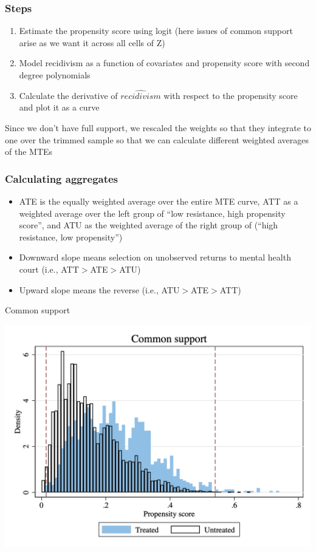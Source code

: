 \documentclass{beamer}
\begin{document}
\begin{frame}
  \frametitle{Steps}

  \begin{enumerate}
    \item Estimate the propensity score using logit (here issues of common support arise as we want it across all cells of Z)
    \item Model recidivism as a function of covariates and propensity score with second degree polynomials
    \item Calculate the derivative of $\widehat{recidivism}$ with respect to the propensity score and plot it as a curve
  \end{enumerate}

  \bigskip

  Since we don't have full support, we rescaled the weights so that they integrate to one over the trimmed sample so that we can calculate different weighted averages of the MTEs


\end{frame}



\begin{frame}
  \frametitle{Calculating aggregates}

  \begin{itemize}
    \item ATE is the equally weighted average over the entire MTE curve, ATT as a weighted average over the left group of ``low resistance, high propensity score'', and ATU as the weighted average of the right group of (``high resistance, low propensity'')
    \item Downward slope means selection on unobserved returns to mental health court (i.e., ATT$>$ATE$>$ATU)
    \item Upward slope means the reverse (i.e., ATU$>$ATE$>$ATT)
  \end{itemize}

\end{frame}

\begin{frame}{Common support}

  \includegraphics[width=\textwidth]{./lecture_includes/common_support_recid.png}

\end{frame}
\end{document}
